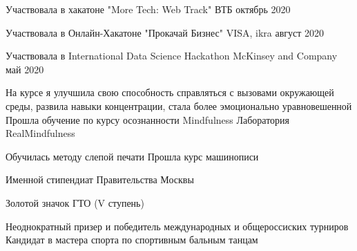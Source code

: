 \documentclass[]{awesome-cv}
\begin{document}
	\begin{cventries}
	\cventry
	{}
	{Участвовала в хакатоне "More Tech: Web Track"}
	{ВТБ}
	{октябрь 2020}
	{}
	\end{cventries}  \vspace{-5mm} \begin{cventries}
	\cventry
	{}
	{Участвовала в Онлайн-Хакатоне "Прокачай Бизнес"}
	{VISA, ikra}
	{август 2020}
	{}
	\end{cventries}  \vspace{-5mm} \begin{cventries}
	\cventry	
	{}
	{Участвовала в International Data Science Hackathon}
	{McKinsey and Company}
	{май 2020}
	{}
		\end{cventries}  \vspace{-5mm}


\begin{cventries}
	\cventry
	{\qquad \bullet На курсе я улучшила свою способность справляться с вызовами окружающей среды, развила навыки концентрации, стала более эмоционально уравновешенной}
	{Прошла обучение по курсу осознанности Mindfulness }
	{Лаборатория RealMindfulness}
	{}
	{}
	\end{cventries}  \vspace{-7mm} \begin{cventries}
	\cventry	
	{\qquad \bullet Обучилась методу слепой печати}
	{Прошла курс машинописи}
	{}
	{}
	{}
		\end{cventries}  \vspace{-7mm}\begin{cventries}
	\cventry 
	{}
	{Именной стипендиат Правительства Москвы}
	{}{}{}
		\end{cventries}  \vspace{-11mm} \begin{cventries}
	\cventry	
	{}
	{Золотой значок ГТО (V ступень)}
	{}
	{}
	{}
		\end{cventries}  \vspace{-11mm} \begin{cventries}
	\cventry
	{\qquad Неоднократный призер и победитель международных и общероссиских турниров}
	{Кандидат в мастера спорта по спортивным бальным танцам}
	{}
	{}
	{}
	\end{cventries} \vspace{-10mm}
\end{document}
